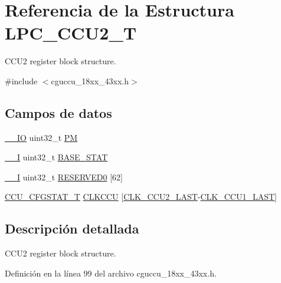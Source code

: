 \hypertarget{struct_l_p_c___c_c_u2___t}{}\section{Referencia de la Estructura L\+P\+C\+\_\+\+C\+C\+U2\+\_\+T}
\label{struct_l_p_c___c_c_u2___t}


C\+C\+U2 register block structure.  




{\ttfamily \#include $<$cguccu\+\_\+18xx\+\_\+43xx.\+h$>$}

\subsection*{Campos de datos}
\begin{DoxyCompactItemize}
\item 
\hyperlink{core__sc300_8h_aec43007d9998a0a0e01faede4133d6be}{\+\_\+\+\_\+\+IO} uint32\+\_\+t \hyperlink{struct_l_p_c___c_c_u2___t_a3d44c3611cd3eaefe7d7214409ef00b8}{PM}
\item 
\hyperlink{core__sc300_8h_af63697ed9952cc71e1225efe205f6cd3}{\+\_\+\+\_\+I} uint32\+\_\+t \hyperlink{struct_l_p_c___c_c_u2___t_aa450381b00ff7d07b6cb5fbcf761dfdc}{B\+A\+S\+E\+\_\+\+S\+T\+AT}
\item 
\hyperlink{core__sc300_8h_af63697ed9952cc71e1225efe205f6cd3}{\+\_\+\+\_\+I} uint32\+\_\+t \hyperlink{struct_l_p_c___c_c_u2___t_af715d3356c6e2bd831a1862864ef1a7e}{R\+E\+S\+E\+R\+V\+E\+D0} \mbox{[}62\mbox{]}
\item 
\hyperlink{struct_c_c_u___c_f_g_s_t_a_t___t}{C\+C\+U\+\_\+\+C\+F\+G\+S\+T\+A\+T\+\_\+T} \hyperlink{struct_l_p_c___c_c_u2___t_a39c975a395ae2f859179c174fde474e7}{C\+L\+K\+C\+CU} \mbox{[}\hyperlink{chip__clocks_8h_a500a6084ba2d6361fa16b75205a8a513a5623cc59964cc18fc2717e74b819071a}{C\+L\+K\+\_\+\+C\+C\+U2\+\_\+\+L\+A\+ST}-\/\hyperlink{chip__clocks_8h_a500a6084ba2d6361fa16b75205a8a513af43f3366ad619d1ac63ac44a6efc0343}{C\+L\+K\+\_\+\+C\+C\+U1\+\_\+\+L\+A\+ST}\mbox{]}
\end{DoxyCompactItemize}


\subsection{Descripción detallada}
C\+C\+U2 register block structure. 

Definición en la línea 99 del archivo cguccu\+\_\+18xx\+\_\+43xx.\+h.



